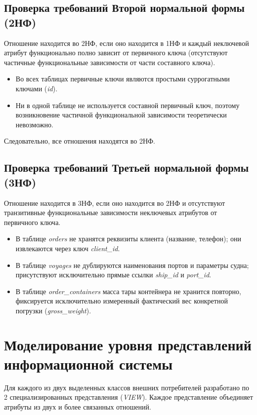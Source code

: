 \documentclass[a4paper,14pt]{article}
\begin{document}
\subsection{Проверка требований Второй нормальной формы (2НФ)}
Отношение находится во 2НФ, если оно находится в 1НФ и каждый неключевой атрибут функционально полно зависит от первичного ключа (отсутствуют частичные функциональные зависимости от части составного ключа).
\begin{itemize}
    \item Во всех таблицах первичные ключи являются простыми суррогатными ключами (\textit{id}).
    \item Ни в одной таблице не используется составной первичный ключ, поэтому возникновение частичной функциональной зависимости теоретически невозможно.
\end{itemize}
Следовательно, все отношения находятся во 2НФ.

\subsection{Проверка требований Третьей нормальной формы (3НФ)}
Отношение находится в 3НФ, если оно находится во 2НФ и отсутствуют транзитивные функциональные зависимости неключевых атрибутов от первичного ключа.
\begin{itemize}
    \item В таблице \textit{orders} не хранятся реквизиты клиента (название, телефон); они извлекаются через ключ \textit{client\_id}.
    \item В таблице \textit{voyages} не дублируются наименования портов и параметры судна; присутствуют исключительно прямые ссылки \textit{ship\_id} и \textit{port\_id}.
    \item В таблице \textit{order\_containers} масса тары контейнера не хранится повторно, фиксируется исключительно измеренный фактический вес конкретной погрузки (\textit{gross\_weight}).
\end{itemize}

\newpage
\section{Моделирование уровня представлений информационной системы}

Для каждого из двух выделенных классов внешних потребителей разработано по 2 специализированных представления (\textit{VIEW}). Каждое представление объединяет атрибуты из двух и более связанных отношений.
\end{document}
